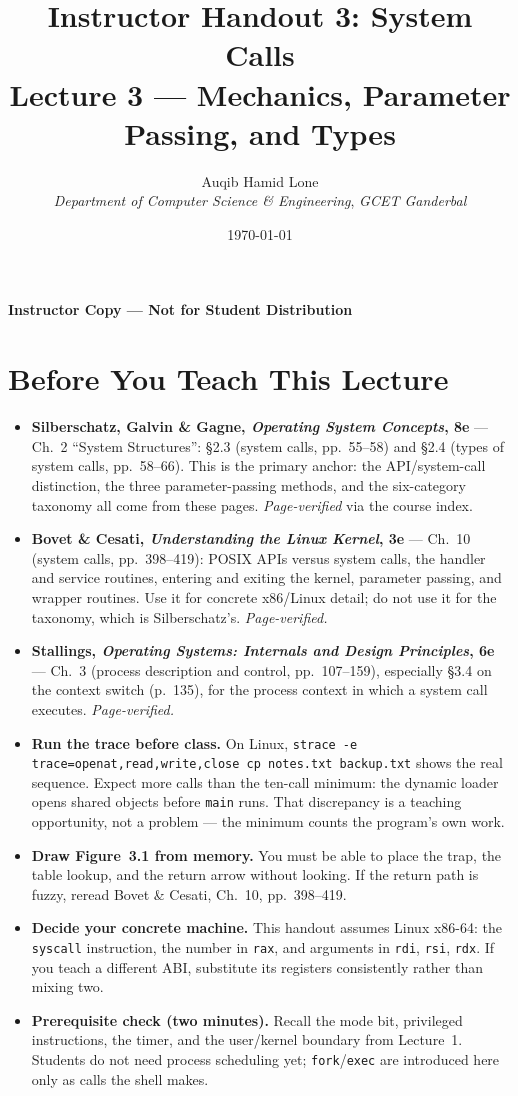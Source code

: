 \documentclass[11pt]{article}
\title{Instructor Handout 3: System Calls\\[0.3em]
  \large Lecture 3 --- Mechanics, Parameter Passing, and Types}
\author{Auqib Hamid Lone\\[0.3em]
  \emph{Department of Computer Science \& Engineering}, \emph{GCET Ganderbal}}
\date{\today}
\begin{document}
\maketitle
{\centering\large\color{negative}\textbf{Instructor Copy --- Not for Student Distribution}\par}
\vspace{0.5cm}

\section{Before You Teach This Lecture}

\begin{itemize}
  \item \textbf{Silberschatz, Galvin \& Gagne, \textit{Operating System Concepts}, 8e} --- Ch.~2 ``System Structures'': \S2.3 (system calls, pp.~55--58) and \S2.4 (types of system calls, pp.~58--66). This is the primary anchor: the API/system-call distinction, the three parameter-passing methods, and the six-category taxonomy all come from these pages. \emph{Page-verified} via the course index.
  \item \textbf{Bovet \& Cesati, \textit{Understanding the Linux Kernel}, 3e} --- Ch.~10 (system calls, pp.~398--419): POSIX APIs versus system calls, the handler and service routines, entering and exiting the kernel, parameter passing, and wrapper routines. Use it for concrete x86/Linux detail; do not use it for the taxonomy, which is Silberschatz's. \emph{Page-verified.}
  \item \textbf{Stallings, \textit{Operating Systems: Internals and Design Principles}, 6e} --- Ch.~3 (process description and control, pp.~107--159), especially \S3.4 on the context switch (p.~135), for the process context in which a system call executes. \emph{Page-verified.}
  \item \textbf{Run the trace before class.} On Linux, \texttt{strace -e trace=openat,read,write,close cp notes.txt backup.txt} shows the real sequence. Expect more calls than the ten-call minimum: the dynamic loader opens shared objects before \texttt{main} runs. That discrepancy is a teaching opportunity, not a problem --- the minimum counts the program's own work.
  \item \textbf{Draw Figure~3.1 from memory.} You must be able to place the trap, the table lookup, and the return arrow without looking. If the return path is fuzzy, reread Bovet \& Cesati, Ch.~10, pp.~398--419.
  \item \textbf{Decide your concrete machine.} This handout assumes Linux x86-64: the \texttt{syscall} instruction, the number in \texttt{rax}, and arguments in \texttt{rdi}, \texttt{rsi}, \texttt{rdx}. If you teach a different ABI, substitute its registers consistently rather than mixing two.
  \item \textbf{Prerequisite check (two minutes).} Recall the mode bit, privileged instructions, the timer, and the user/kernel boundary from Lecture~1. Students do not need process scheduling yet; \texttt{fork}/\texttt{exec} are introduced here only as calls the shell makes.
\end{itemize}
\end{document}
